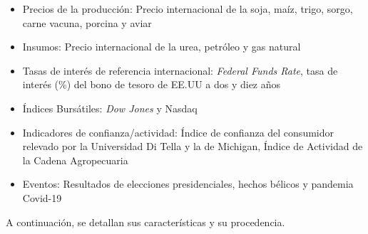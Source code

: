 \documentclass[12pt]{article}
\providecommand{\tightlist}{%
  \setlength{\itemsep}{0pt}\setlength{\parskip}{0pt}}\usepackage{longtable,booktabs,array}
\begin{document}
\begin{itemize}
\tightlist
\item
  Precios de la producción: Precio internacional de la soja, maíz,
  trigo, sorgo, carne vacuna, porcina y aviar
\item
  Insumos: Precio internacional de la urea, petróleo y gas natural
\item
  Tasas de interés de referencia internacional: \emph{Federal Funds
  Rate}, tasa de interés (\%) del bono de tesoro de EE.UU a dos y diez
  años
\item
  Índices Bursátiles: \emph{Dow Jones} y Nasdaq
\item
  Indicadores de confianza/actividad: Índice de confianza del consumidor
  relevado por la Universidad Di Tella y la de Michigan, Índice de
  Actividad de la Cadena Agropecuaria
\item
  Eventos: Resultados de elecciones presidenciales, hechos bélicos y
  pandemia Covid-19
\end{itemize}

A continuación, se detallan sus características y su procedencia.
\end{document}
